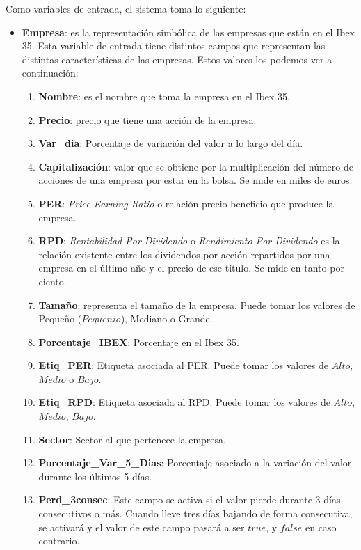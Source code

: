 \documentclass[10pt,spanish]{article}
\theoremstyle{plain}
\theoremstyle{definition}
\begin{document}
Como variables de entrada, el sistema toma lo siguiente:
\begin{itemize}
    \item \textbf{Empresa}: es la representación simbólica de las empresas que están en el Ibex 35. Esta variable de entrada tiene distintos campos que representan las distintas características de las empresas. Estos valores los podemos ver a continuación:
    \begin{enumerate}[$\diamond$]
        \item \textbf{Nombre}: es el nombre que toma la empresa en el Ibex 35.
        \item \textbf{Precio}: precio que tiene una acción de la empresa.
        \item \textbf{Var\_dia}: Porcentaje de variación del valor a lo largo del día.
        \item \textbf{Capitalización}: valor que se obtiene por la multiplicación del número de acciones de una empresa por estar en la bolsa. Se mide en miles de euros.
        \item \textbf{PER}: \textit{Price Earning Ratio} o relación precio beneficio que produce la empresa.
        \item \textbf{RPD}: \textit{Rentabilidad Por Dividendo} o \textit{Rendimiento Por Dividendo} es la relación existente entre los dividendos por acción repartidos por una empresa en el último año y el precio de ese título. Se mide en tanto por ciento.
        \item \textbf{Tamaño}: representa el tamaño de la empresa. Puede tomar los valores de Pequeño ($Pequenio$), Mediano o Grande.
        \item \textbf{Porcentaje\_IBEX}: Porcentaje en el Ibex 35.
        \item \textbf{Etiq\_PER}: Etiqueta asociada al PER. Puede tomar los valores de $Alto$, $Medio$ o $Bajo$.
        \item \textbf{Etiq\_RPD}: Etiqueta asociada al RPD. Puede tomar los valores de  $Alto$, $Medio$, $Bajo$.
        \item \textbf{Sector}: Sector al que pertenece la empresa.
        \item \textbf{Porcentaje\_Var\_5\_Dias}: Porcentaje asociado a la variación del valor durante los últimos 5 días.
        \item \textbf{Perd\_3consec}: Este campo se activa si el valor pierde durante 3 días consecutivos o más. Cuando lleve tres días bajando de forma consecutiva, se activará y el valor de este campo pasará a ser $true$, y $false$ en caso contrario.

\end{enumerate}
\end{itemize}
\end{document}
